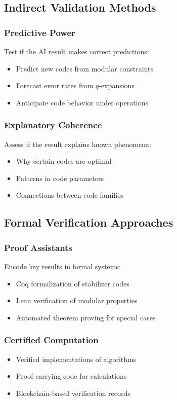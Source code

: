 \documentclass[11pt,a4paper]{article}
\begin{document}
\subsection{Indirect Validation Methods}

\subsubsection{Predictive Power}
Test if the AI result makes correct predictions:
\begin{itemize}
\item Predict new codes from modular constraints
\item Forecast error rates from $q$-expansions
\item Anticipate code behavior under operations
\end{itemize}

\subsubsection{Explanatory Coherence}
Assess if the result explains known phenomena:
\begin{itemize}
\item Why certain codes are optimal
\item Patterns in code parameters
\item Connections between code families
\end{itemize}

\subsection{Formal Verification Approaches}

\subsubsection{Proof Assistants}
Encode key results in formal systems:
\begin{itemize}
\item Coq formalization of stabilizer codes
\item Lean verification of modular properties
\item Automated theorem proving for special cases
\end{itemize}

\subsubsection{Certified Computation}
\begin{itemize}
\item Verified implementations of algorithms
\item Proof-carrying code for calculations
\item Blockchain-based verification records
\end{itemize}
\end{document}
